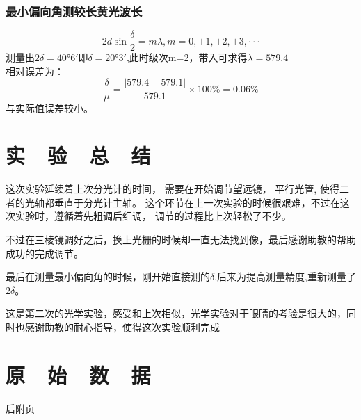 \documentclass{thuemp}
\begin{document}
\subsubsection{最小偏向角测较长黄光波长}
$$2 d \sin \frac{\delta}{2} = m\lambda , m=0,\pm1,\pm2,\pm3,···$$
测量出$2\delta = 40°6'$即$\delta = 20°3'$,此时级次m=2，带入可求得$\lambda = 579.4$
\\相对误差为：
$$\frac{\delta}{\mu}=\frac{|579.4-579.1|}{579.1}\times 100\%= 0.06\%$$与实际值误差较小。
\section{实~~验~~总~~结}
这次实验延续着上次分光计的时间，
需要在开始调节望远镜，
平行光管,
使得二者的光轴都垂直于分光计主轴。
这个环节在上一次实验的时候很艰难，不过在这次实验时，遵循着先粗调后细调，
调节的过程比上次轻松了不少。

不过在三棱镜调好之后，换上光栅的时候却一直无法找到像，最后感谢助教的帮助成功的完成调节。

最后在测量最小偏向角的时候，刚开始直接测的$\delta$,后来为提高测量精度,重新测量了$2\delta$。

这是第二次的光学实验，感受和上次相似，光学实验对于眼睛的考验是很大的，同时也感谢助教的耐心指导，使得这次实验顺利完成
\section*{原~~始~~数~~据}
后附页


\newpage
\end{document}
